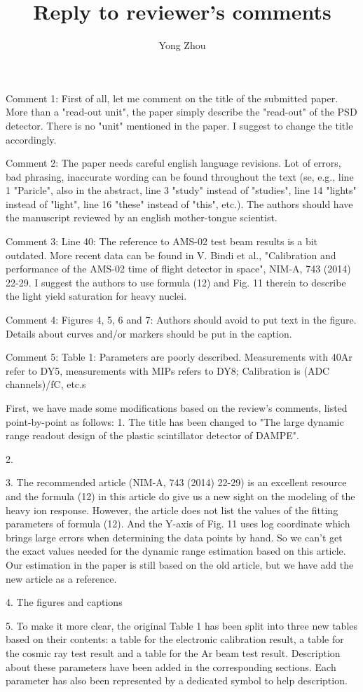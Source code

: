 \documentclass[]{article}
\title{Reply to reviewer's comments}
\author{Yong Zhou}
\begin{document}
\maketitle

\section{}
Comment 1: First of all, let me comment on the title of the submitted paper. More than a "read-out unit", the paper simply describe the "read-out" of the PSD detector. There is no "unit" mentioned in the paper. I suggest to change the title accordingly.

Comment 2: The paper needs careful english language revisions. Lot of errors, bad phrasing, inaccurate wording can be found throughout the text (se, e.g., line 1 "Paricle", also in the abstract, line 3 "study" instead of "studies", line 14 "lights" instead of "light", line 16 "these" instead of "this", etc.). The authors should have the manuscript reviewed by an english mother-tongue scientist.

Comment 3: Line 40: The reference to AMS-02 test beam results is a bit outdated. More recent data can be found in V. Bindi et al., "Calibration and performance of the AMS-02 time of flight detector in space", NIM-A, 743 (2014) 22-29. I suggest the authors to use formula (12) and Fig. 11 therein to describe the light yield saturation for heavy nuclei.

Comment 4: Figures 4, 5, 6 and 7: Authors should avoid to put text in the figure. Details about curves and/or markers should be put in the caption.

Comment 5: Table 1: Parameters are poorly described. Measurements with 40Ar refer to DY5, measurements with MIPs refers to DY8; Calibration is (ADC channels)/fC, etc.s

First, we have made some modifications based on the review's comments, listed point-by-point as follows:
1. The title has been changed to "The large dynamic range readout design of the plastic scintillator detector of DAMPE".

2. 

3. The recommended article (NIM-A, 743 (2014) 22-29) is an excellent resource and the formula (12) in this article do give us a new sight on the modeling of the heavy ion response. However, the article does not list the values of the fitting parameters of formula (12). And the Y-axis of Fig. 11 uses log coordinate which brings large errors when determining the data points by hand. So we can't get the exact values needed for the dynamic range estimation based on this article. Our estimation in the paper is still based on the old article, but we have add the new article as a reference.

4. The figures and captions 

5. To make it more clear, the original Table 1 has been split into three new tables based on their contents: a table for the electronic  calibration result, a table for the cosmic ray test result and a table for the Ar beam test result. Description about these parameters have been added in the corresponding sections. Each parameter has also been represented by a dedicated symbol to help description.
\end{document}
